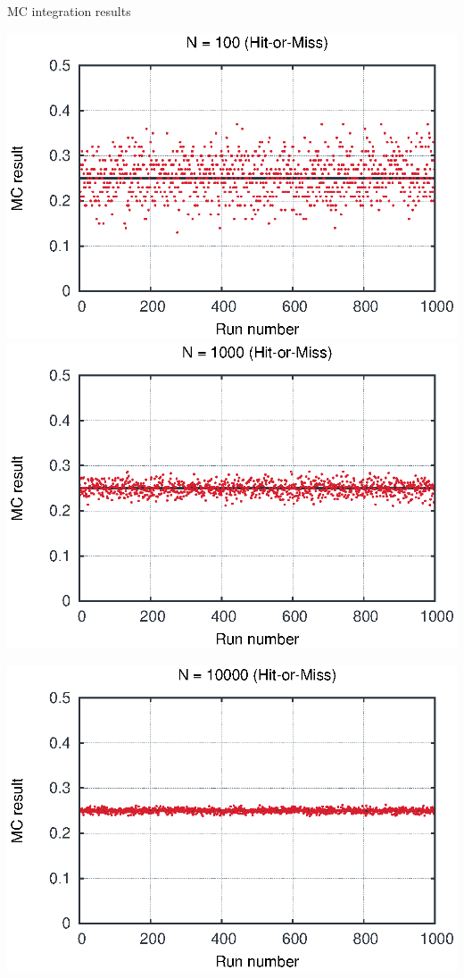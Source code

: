 \begin{emptyslide}{MC integration results}
\null\vfill

  \twocolumn
  {
    
    \includegraphics[width=\columnwidth]{figures/int100.eps}
    \includegraphics[width=\columnwidth]{figures/int1000.eps}
  }
  {
    \includegraphics[width=\columnwidth]{figures/int10000.eps}
}
\end{emptyslide}
